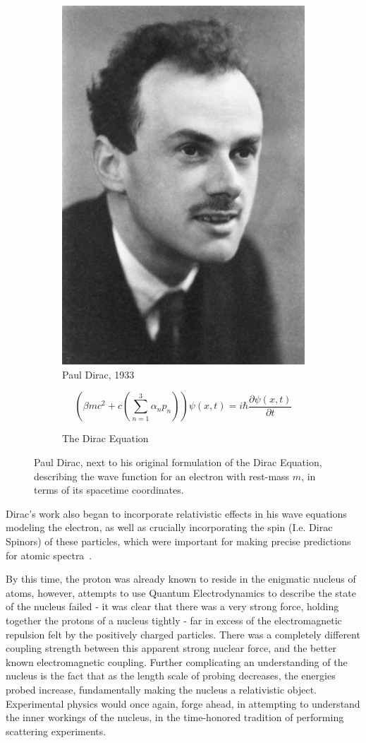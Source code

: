\begin{figure}[ht]
	\centering
	\begin{subfigure}{.4\textwidth}
		\centering
		\includegraphics[width=0.4\linewidth]{figures/pauldirac.jpg}
		\caption{Paul Dirac, 1933 ~\cite{NobelFoundation1933}}
		\label{fig:pauldirac}
	\end{subfigure}%
	\begin{subfigure}{0.6\textwidth}
		\centering
		\begin{equation}
			\left(\beta mc^2 + c\left(\sum_{n \mathop =1}^{3}\alpha_n p_n\right)\right) \psi (x,t) = i \hbar \frac{\partial\psi(x,t) }{\partial t}
		\end{equation}
		\caption{The Dirac Equation}
		\label{eq:diracquation}
	\end{subfigure}
	\caption{ 
		Paul Dirac, next to his original formulation of the Dirac Equation,
		describing the wave function for an electron with rest-mass $m$, in terms of
		its spacetime coordinates.
	}
	\label{fig:thomsonrays}
\end{figure}

Dirac's work also began to incorporate relativistic effects in his wave
equations modeling the electron, as well as crucially incorporating the spin
(I.e. Dirac Spinors) of these particles, which were important for making precise
predictions for atomic spectra~\needcite{}.

By this time, the proton was already known to reside in the enigmatic nucleus of
atoms, however, attempts to use Quantum Electrodynamics to describe the state of
the nucleus failed - it was clear that there was a very strong force, holding
together the protons of a nucleus tightly - far in excess of the electromagnetic
repulsion felt by the positively charged particles. There was a completely
different coupling strength between this apparent strong nuclear force, and the
better known electromagnetic coupling. Further complicating an understanding of
the nucleus is the fact that as the length scale of probing decreases, the
energies probed increase, fundamentally making the nucleus a relativistic
object. Experimental physics would once again, forge ahead, in attempting to
understand the inner workings of the nucleus, in the time-honored tradition of
performing scattering experiments.

